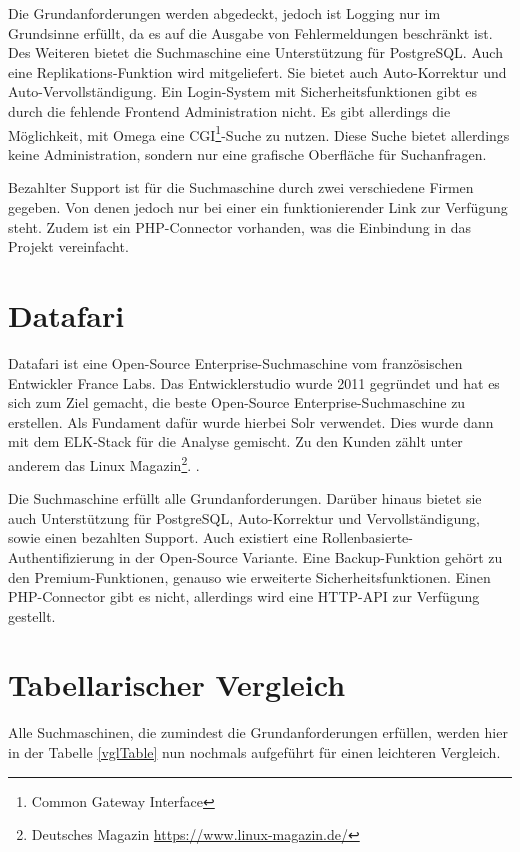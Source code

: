 Die Grundanforderungen werden abgedeckt, jedoch ist Logging nur im Grundsinne erfüllt, da es auf die Ausgabe von Fehlermeldungen beschränkt ist. Des Weiteren bietet die Suchmaschine eine Unterstützung für PostgreSQL. Auch eine Replikations-Funktion wird mitgeliefert. Sie bietet auch Auto-Korrektur und Auto-Vervollständigung. Ein Login-System mit Sicherheitsfunktionen gibt es durch die fehlende Frontend Administration nicht. Es gibt allerdings die Möglichkeit, mit Omega eine CGI\footnote{Common Gateway Interface}-Suche zu nutzen. Diese Suche bietet allerdings keine Administration, sondern nur eine grafische Oberfläche für Suchanfragen.

Bezahlter Support ist für die Suchmaschine durch zwei verschiedene Firmen gegeben. Von denen jedoch nur bei einer ein funktionierender Link zur Verfügung steht. Zudem ist ein PHP-Connector vorhanden, was die Einbindung in das Projekt vereinfacht. \cite{XAP.2019}

\section{Datafari}
\label{datafari}

Datafari ist eine Open-Source Enterprise-Suchmaschine vom französischen Entwickler France Labs. Das Entwicklerstudio wurde 2011 gegründet und hat es sich zum Ziel gemacht, die beste Open-Source Enterprise-Suchmaschine zu erstellen. \cite{Labs.2019} Als Fundament dafür wurde hierbei Solr verwendet. Dies wurde dann mit dem ELK-Stack für die Analyse gemischt. Zu den Kunden zählt unter anderem das Linux Magazin\footnote{Deutsches Magazin \url{https://www.linux-magazin.de/}}. \cite{MichaelBrandenburg.2019}.

Die Suchmaschine erfüllt alle Grundanforderungen. Darüber hinaus bietet sie auch Unterstützung für PostgreSQL, Auto-Korrektur und Vervollständigung, sowie einen bezahlten Support. Auch existiert eine Rollenbasierte-Authentifizierung in der Open-Source Variante. Eine Backup-Funktion gehört zu den Premium-Funktionen, genauso wie erweiterte Sicherheitsfunktionen. Einen PHP-Connector gibt es nicht, allerdings wird eine HTTP-API zur Verfügung gestellt. \cite{Labs.b}

\newpage
\section{Tabellarischer Vergleich}

Alle Suchmaschinen, die zumindest die Grundanforderungen erfüllen, werden hier in der Tabelle \ref{vglTable} nun nochmals aufgeführt für einen leichteren Vergleich.

